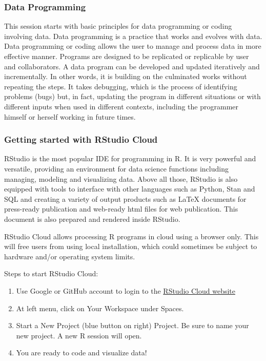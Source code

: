 \documentclass[
]{book}
\providecommand{\tightlist}{%
  \setlength{\itemsep}{0pt}\setlength{\parskip}{0pt}}
\begin{document}
\hypertarget{data-programming}{%
\subsubsection{Data Programming}\label{data-programming}}

This session starts with basic principles for data programming or coding involving data. Data programming is a practice that works and evolves with data. Data programming or coding allows the user to manage and process data in more effective manner. Programs are designed to be replicated or replicable by user and collaborators. A data program can be developed and updated iteratively and incrementally. In other words, it is building on the culminated works without repeating the steps. It takes debugging, which is the process of identifying problems (bugs) but, in fact, updating the program in different situations or with different inputs when used in different contexts, including the programmer himself or herself working in future times.

\hypertarget{getting-started-with-rstudio-cloud}{%
\subsubsection{Getting started with RStudio Cloud}\label{getting-started-with-rstudio-cloud}}

RStudio is the most popular IDE for programming in R. It is very powerful and versatile, providing an environment for data science functions including managing, modeling and visualizing data. Above all those, RStudio is also equipped with tools to interface with other languages such as Python, Stan and SQL and creating a variety of output products such as LaTeX documents for press-ready publication and web-ready html files for web publication. This document is also prepared and rendered inside RStudio.

RStudio Cloud allows processing R programs in cloud using a browser only. This will free users from using local installation, which could sometimes be subject to hardware and/or operating system limits.

Steps to start RStudio Cloud:

\begin{enumerate}
\def\labelenumi{\arabic{enumi}.}
\tightlist
\item
  Use Google or GitHub account to login to the \href{http://Rstudio.cloud}{RStudio Cloud website}
\item
  At left menu, click on Your Workspace under Spaces.\\
\item
  Start a New Project (blue button on right) Project. Be sure to name your new project. A new R session will open.
\item
  You are ready to code and visualize data!
\end{enumerate}
\end{document}
